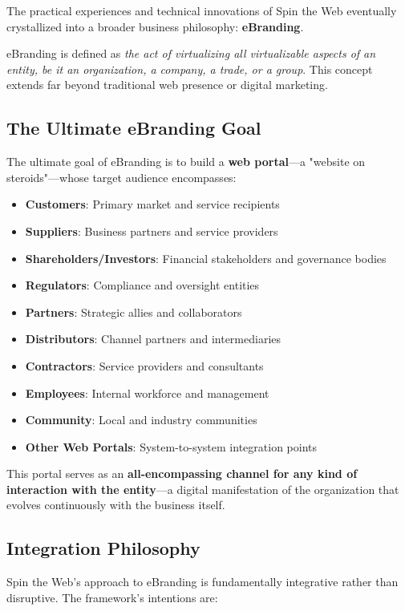 The practical experiences and technical innovations of Spin the Web eventually crystallized into a broader business philosophy: \textbf{eBranding}.

eBranding is defined as \textit{the act of virtualizing all virtualizable aspects of an entity, be it an organization, a company, a trade, or a group}. This concept extends far beyond traditional web presence or digital marketing.

\subsection{The Ultimate eBranding Goal}

The ultimate goal of eBranding is to build a \textbf{web portal}—a "website on steroids"—whose target audience encompasses:

\begin{itemize}
\item \textbf{Customers}: Primary market and service recipients
\item \textbf{Suppliers}: Business partners and service providers
\item \textbf{Shareholders/Investors}: Financial stakeholders and governance bodies
\item \textbf{Regulators}: Compliance and oversight entities
\item \textbf{Partners}: Strategic allies and collaborators
\item \textbf{Distributors}: Channel partners and intermediaries
\item \textbf{Contractors}: Service providers and consultants
\item \textbf{Employees}: Internal workforce and management
\item \textbf{Community}: Local and industry communities
\item \textbf{Other Web Portals}: System-to-system integration points
\end{itemize}

This portal serves as an \textbf{all-encompassing channel for any kind of interaction with the entity}—a digital manifestation of the organization that evolves continuously with the business itself.

\subsection{Integration Philosophy}

Spin the Web's approach to eBranding is fundamentally integrative rather than disruptive. The framework's intentions are:

